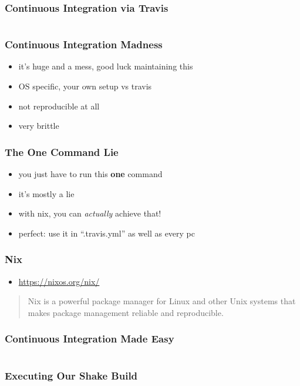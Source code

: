 \documentclass{beamer}
\begin{document}
\begin{frame}
  \frametitle{Continuous Integration via Travis}
  \inputminted[linenos=false, fontsize=\tiny, firstline=91, lastline=120]{yaml}{static-source/long-travis-ci.yml}
\end{frame}

\begin{frame}
  \frametitle{Continuous Integration Madness}
  \begin{itemize}
  \item it's huge and a mess, good luck maintaining this
  \item OS specific, your own setup vs travis
  \item not reproducible at all
  \item very brittle
  \end{itemize}
\end{frame}

\begin{frame}
  \frametitle{The One Command Lie}
  \begin{itemize}
  \item you just have to run this \textbf{one} command
  \item it's mostly a lie
  \item with nix, you can \textit{actually} achieve that!
  \item perfect: use it in ``.travis.yml'' as well as every pc
  \end{itemize}
\end{frame}

\begin{frame}
  \frametitle{Nix}
  \begin{itemize}
  \item \url{https://nixos.org/nix/}
  \end{itemize}
  \begin{quote}
    Nix is a powerful package manager for Linux and other Unix systems that makes package management reliable and reproducible.
  \end{quote}
\end{frame}

\begin{frame}
  \frametitle{Continuous Integration Made Easy}
  \inputminted{yaml}{snippets/travis.yml}
\end{frame}

\begin{frame}
  \frametitle{Executing Our Shake Build}
  \inputminted[breaklines]{yaml}{snippets/build-shebang.hs}
\end{frame}
\end{document}
